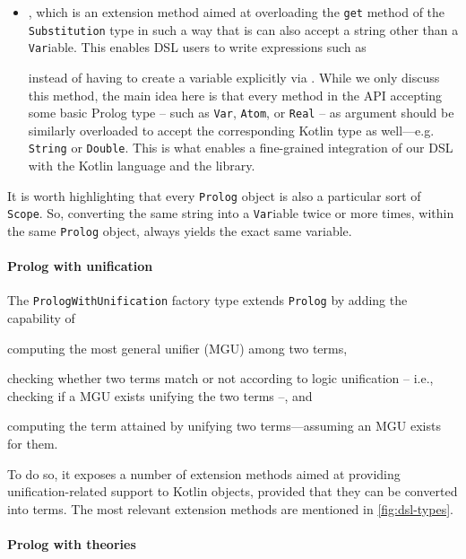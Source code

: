 \documentclass[12pt,a4paper,openright,twoside]{book}
\begin{document}
\begin{itemize}
    \item {}, which is an extension method aimed at overloading the \texttt{get} method of the \texttt{Substitution} type in such a way that is can also accept a string other than a \texttt{Var}iable.
    This enables DSL users to write expressions such as
    \begin{center}
    \end{center}
    instead of having to create a variable explicitly via .
    While we only discuss this method, the main idea here is that every method in the \twopkt{} API accepting some basic Prolog type -- such as \texttt{Var}, \texttt{Atom}, or \texttt{Real} -- as argument should be similarly overloaded to accept the corresponding Kotlin type as well---e.g. \texttt{String} or \texttt{Double}.
    This is what enables a fine-grained integration of our DSL with the Kotlin language and the \twopkt{} library.
\end{itemize}
%
It is worth highlighting that every \texttt{Prolog} object is also a particular sort of \texttt{Scope}.
%
So, converting the same string into a \texttt{Var}iable twice or more times, within the same \texttt{Prolog} object, always yields the exact same variable.

\paragraph{Prolog with unification}

The \texttt{Pro\-logWi\-thU\-ni\-fi\-ca\-tion} factory type extends \texttt{Prolog} by adding the capability of
%
\begin{inlinelist}
    \item computing the most general unifier (MGU) among two terms,
    \item checking whether two terms match or not according to logic unification -- i.e., checking if a MGU exists unifying the two terms --, and
    \item computing the term attained by unifying two terms---assuming an MGU exists for them.
\end{inlinelist}
%
To do so, it exposes a number of extension methods aimed at providing unification-related support to Kotlin objects, provided that they can be converted into terms.
%
The most relevant extension methods are mentioned in \cref{fig:dsl-types}.

\paragraph{Prolog with theories}
\end{document}
